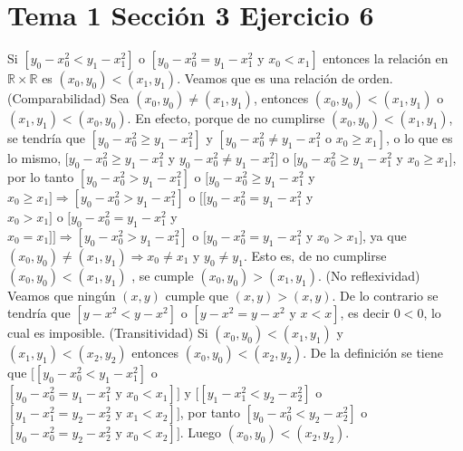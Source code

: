 \documentclass{article}
\begin{document}
\section{Tema 1 Sección 3 Ejercicio 6}
Si \([y_0-x_{0}^{2}<y_1-x_{1}^{2}]\) o \([y_0-x_{0}^{2}=y_1-x_{1}^{2}\text{ y } x_0<x_1]\) entonces la relación en \(\mathbb{R}\times\mathbb{R}\) es \((x_0,y_0) <(x_1,y_1)\). Veamos que es una relación de orden. (Comparabilidad) Sea \((x_0, y_0)\neq(x_1,y_1)\), entonces \((x_0,y_0) <(x_1,y_1)\) o \((x_1,y_1) <(x_0,y_0)\). En efecto, porque de no cumplirse \((x_0,y_0) <(x_1,y_1)\), se tendría que \([y_0-x_{0}^{2}\geq y_1-x_{1}^{2}]\) y \([y_0-x_{0}^{2}\neq y_1-x_{1}^{2}\text{ o } x_0\geq x_1]\), o lo que es lo mismo, \([y_0-x_{0}^{2}\geq y_1-x_{1}^{2}\) y \(y_0-x_{0}^{2}\neq y_1-x_{1}^{2}]\text{ o } [y_0-x_{0}^{2}\geq y_1-x_{1}^{2}\) y \(x_0\geq x_1]\), por lo tanto \([y_0-x_{0}^{2} > y_1-x_{1}^{2}]\text{ o } [y_0-x_{0}^{2}\geq y_1-x_{1}^{2}\) y \(x_0\geq x_1] \Rightarrow [y_0-x_{0}^{2} > y_1-x_{1}^{2}]\text{ o } [[y_0-x_{0}^{2}= y_1-x_{1}^{2}\) y \(x_0 > x_1]\text{ o } [y_0-x_{0}^{2}= y_1-x_{1}^{2}\) y \(x_0 = x_1]]\Rightarrow  [y_0-x_{0}^{2} > y_1-x_{1}^{2}]\text{ o } [y_0-x_{0}^{2}= y_1-x_{1}^{2}\) y \(x_0 > x_1] \), ya que  \((x_0, y_0)\neq (x_1,y_1)\Rightarrow x_0\neq x_1 \text{ y } y_0\neq y_1\). Esto es, de no cumplirse \((x_0,y_0) <(x_1,y_1)\) , se cumple \((x_0,y_0) >(x_1,y_1)\). (No reflexividad) Veamos que ningún \((x,y)\) cumple que \((x,y)>(x,y)\). De lo contrario se tendría que \([y-x^{2}<y-x^{2}]\) o \([y-x^{2}=y-x^{2}\text{ y } x<x]\), es decir \(0<0\), lo cual es imposible. (Transitividad) Si \((x_0,y_0) <(x_1,y_1)\) y \((x_1,y_1) <(x_2,y_2)\) entonces \((x_0,y_0) <(x_2,y_2)\). De la definición se tiene que \([[y_0-x_{0}^{2}<y_1-x_{1}^{2}]\) o \([y_0-x_{0}^{2}=y_1-x_{1}^{2}\text{ y } x_0<x_1]] \text{ y }[[y_1-x_{1}^{2}<y_2-x_{2}^{2}]\) o \([y_1-x_{1}^{2}=y_2-x_{2}^{2}\text{ y } x_1<x_2]]\), por tanto \([y_0-x_{0}^{2}<y_2-x_{2}^{2}]\) o \([y_0-x_{0}^{2}=y_2-x_{2}^{2}\text{ y } x_0<x_2]]\). Luego \((x_0,y_0)<(x_2,y_2)\).
\end{document}
